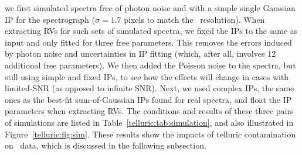 we first simulated spectra free of photon noise and with a simple
single Gaussian IP for the spectrograph ($\sigma = 1.7$ pixels to
match the \keck\ resolution). When extracting RVs for such sets of
simulated spectra, we fixed the IPs to the same as input and only
fitted for three free parameters. This removes the errors induced by
photon noise and uncertainties in IP fitting (which, after all,
involves 12 additional free parameters). We then added the Poisson
noise to the spectra, but still using simple and fixed IPs, to see how
the effects will change in cases with limited-SNR (as opposed to
infinite SNR). Next, we used complex IPs, the same ones as the
best-fit sum-of-Gaussian IPs found for real spectra, and float the IP
parameters when extracting RVs.  The conditions and
results of these three pairs of simulations are listed in
Table~\ref{telluric:tab:simulation}, and also illustrated in
Figure~\ref{telluric:fig:sim}. These results show the impacts of
telluric contamination on \keck\ data, which is discussed in the
following subsection.


